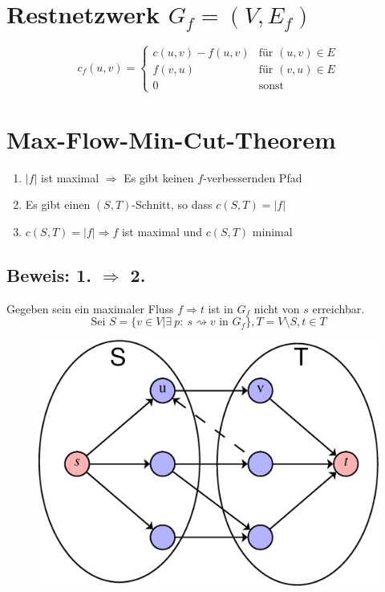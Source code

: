 \section{Restnetzwerk $G_f=(V,E_f)$}
\[ c_f(u,v)=\begin{cases}
c(u,v)-f(u,v)&\text{für }(u,v)\in E\\
f(v,u)&\text{für }(v,u)\in E\\
0 & \text{sonst}
\end{cases} \]
\section{Max-Flow-Min-Cut-Theorem}
\begin{enumerate}
	\item $|f|$ ist maximal $\Rightarrow$ Es gibt keinen $f$-verbessernden Pfad
	\item Es gibt einen $(S,T)$-Schnitt, so dass $c(S,T)=|f|$
	\item $c(S,T) = |f| \Rightarrow f$ ist maximal und $c(S,T)$ minimal
\end{enumerate}
\subsection{Beweis: 1. $\Rightarrow$ 2.}
Gegeben sein ein maximaler Fluss $f\Rightarrow  t$ ist in $G_f$ nicht von $s$ erreichbar.
\[ \text{Sei }S=\{ v\in V | \exists~p:~s \rightsquigarrow v \text{ in } G_f \}, T=V\setminus S, t \in T \]
\begin{figure}
	\centering
	\includegraphics[width=\linewidth]{25/Grafik/Diagramm2}
	\caption{}
\end{figure}
